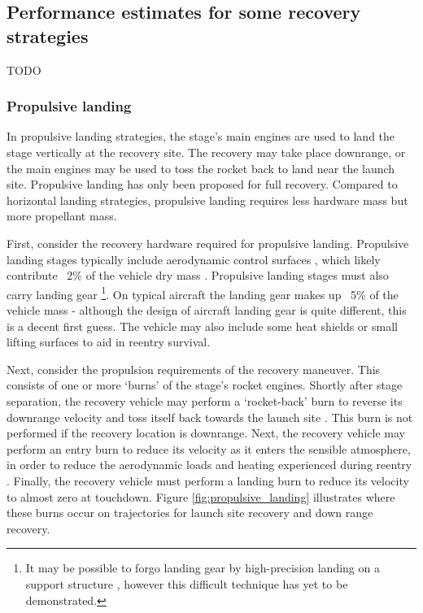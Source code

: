\documentclass[conf]{new-aiaa}
\begin{document}
\subsection{Performance estimates for some recovery strategies}
TODO

\subsubsection{Propulsive landing}
In propulsive landing strategies, the stage's main engines are used to land the stage vertically at the recovery site. The recovery may take place downrange, or the main engines may be used to toss the rocket back to land near the launch site. Propulsive landing has only been proposed for full recovery. Compared to horizontal landing strategies, propulsive landing requires less hardware mass but more propellant mass.

First, consider the recovery hardware required for propulsive landing. Propulsive landing stages typically include aerodynamic control surfaces \cite{NewGlenn, Falcon9, DCX, Musk2017}, which likely contribute ~2\% of the vehicle dry mass \cite{Sforza2015}. Propulsive landing stages must also carry landing gear \footnote{It may be possible to forgo landing gear by high-precision landing on a support structure \cite{Musk2017}, however this difficult technique has yet to be demonstrated.}. On typical aircraft the landing gear makes up ~5\% of the vehicle mass \cite{Sforza2015} - although the design of aircraft landing gear is quite different, this is a decent first guess. The vehicle may also include some heat shields or small lifting surfaces to aid in reentry survival.

Next, consider the propulsion requirements of the recovery maneuver. This consists of one or more `burns' of the stage's rocket engines. Shortly after stage separation, the recovery vehicle may perform a `rocket-back' burn to reverse its downrange velocity and toss itself back towards the launch site \cite{McKinney1986, NAP13534}. This burn is not performed if the recovery location is downrange. Next, the recovery vehicle may perform an entry burn to reduce its velocity as it enters the sensible atmosphere, in order to reduce the aerodynamic loads and heating experienced during reentry \cite{Stappert2017}. Finally, the recovery vehicle must perform a landing burn to reduce its velocity to almost zero at touchdown. Figure \ref{fig:propulsive_landing} illustrates where these burns occur on trajectories for launch site recovery and down range recovery.
\end{document}
